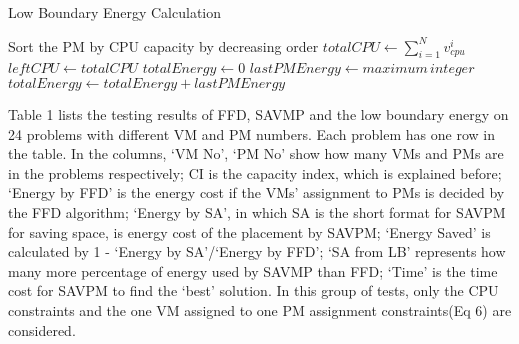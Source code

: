\documentclass[10pt, conference, compsocconf]{IEEEtran}
\begin{document}
\begin{algorithm}
\SetAlgoLined
\LinesNumbered
\caption{Low Boundary Energy Calculation}
	Sort the PM by CPU capacity by decreasing order \;
	$totalCPU\leftarrow \sum_{i=1}^Nv_{cpu}^i $ \;
	$leftCPU\leftarrow totalCPU$\;
	$totalEnergy\leftarrow 0$ \;
	$lastPMEnergy\leftarrow maximum\, integer$ \;	
	$totalEnergy\leftarrow totalEnergy + lastPMEnergy$ \;
\end{algorithm}

Table 1 lists the testing results of FFD, SAVMP and the low boundary energy on
24 problems with different VM and PM numbers. Each problem has one row in the
table.  In the columns, `VM No', `PM No' show how many VMs and PMs are
in the problems respectively; CI is the capacity index, which is explained
before; `Energy by FFD' is the energy cost if the VMs' assignment to PMs  is
decided by the FFD algorithm; `Energy by SA', in which SA is the short format
for SAVPM for saving space, is energy cost of the placement by SAVPM; `Energy
Saved' is calculated by 1 - `Energy by SA'/`Energy by FFD'; `SA from LB'
represents how many more percentage of energy used by SAVMP than FFD; `Time' is
the time cost for SAVPM to find the `best' solution.
In this group of tests, only the CPU constraints and the one VM assigned to one PM
assignment constraints(Eq 6) are considered.
\end{document}
